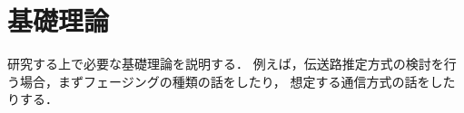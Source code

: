 \section{基礎理論}
\label{sec:fundamental_theory}
研究する上で必要な基礎理論を説明する．
例えば，伝送路推定方式の検討を行う場合，まずフェージングの種類の話をしたり，
想定する通信方式の話をしたりする．